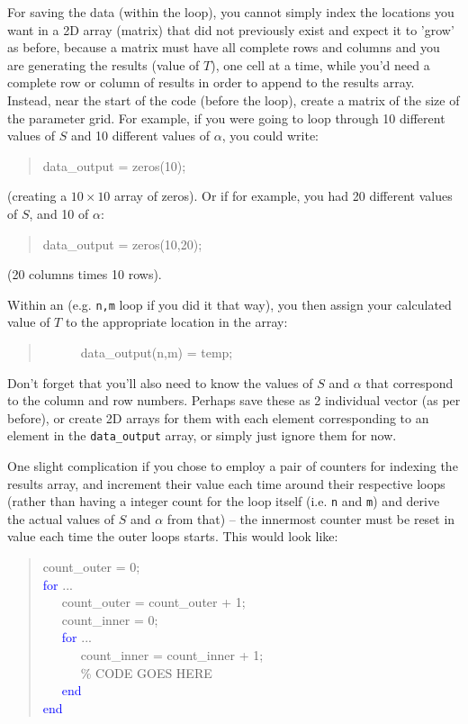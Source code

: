 \documentclass{tufte-book} %
\newenvironment{docspec}{\begin{quotation}\ttfamily\parskip0pt\parindent0pt\ignorespaces}{\end{quotation}}
\begin{document}
For saving the data (within the loop), you cannot  simply index the locations you want in a 2D array (matrix) that did not previously exist and expect it to 'grow' as before, because a matrix must have all complete rows and columns and you are generating the results (value of \(T\)), one cell at a time, while you'd need a complete row or column of results in order to append to the results array. Instead, near the start of the code (before the loop), create a matrix of the size of the parameter grid. For example, if you were going to loop through 10 different values of \(S\) and 10 different values of \(\alpha\), you could write:
\begin{docspec}
data\_output = zeros(10);
\end{docspec}
(creating a \(10\times10\) array of zeros). Or if for example, you had 20 different  values of \(S\), and 10 of \(\alpha\):
\begin{docspec}
data\_output = zeros(10,20);
\end{docspec}
(20 columns times 10 rows).

Within an (e.g. \texttt{n,m} loop if you did it that way), you then assign your calculated value of \(T\) to the appropriate location in the array:
\begin{docspec}
\ \ \ \ \ \ data\_output(n,m) = temp;
\end{docspec}
Don't forget that you'll also need to know the values of \(S\) and \(\alpha\) that correspond to the column and row numbers. Perhaps save these as 2 individual vector (as per before), or create 2D arrays for them with each element corresponding to an element in the \texttt{data\_output} array, or simply just ignore them for now.

One slight complication if you chose to employ a pair of counters for indexing the results array, and increment their value each time around their respective loops (rather than having a integer count for the loop itself (i.e. \texttt{n} and \texttt{m}) and derive the actual values of  \(S\) and \(\alpha\) from that) -- the innermost counter must be reset in value each time the outer loops starts. This would look like:

\vspace{8mm}
\pagebreak

\begin{docspec}
count\_outer = 0;
\\\textcolor{blue}{for} ...
\\ \ \ \ count\_outer = count\_outer + 1;
\\ \ \ \ count\_inner = 0;
\\ \ \ \ \textcolor{blue}{for} ...
\\ \ \ \ \ \ \ count\_inner = count\_inner + 1;
\\ \ \ \ \ \ \ \textcolor[rgb]{0,0.501961,0}{\% CODE GOES HERE}
\\ \ \ \ \textcolor{blue}{end}
\\\textcolor{blue}{end}
\end{docspec}
\end{document}
